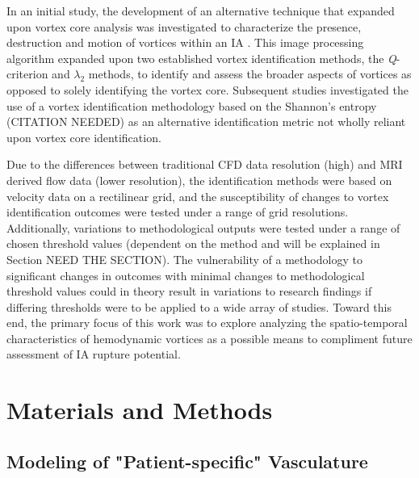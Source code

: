 In an initial study, the development of an alternative technique that expanded upon vortex core analysis was investigated to characterize the presence, destruction and motion of vortices within an IA \cite{sunderland2016vortex}. This image processing algorithm expanded upon two established vortex identification methods, the \textit{Q}-criterion \cite{hunt1988eddies} and $\lambda_2$ \cite{jeong1995identification} methods, to identify and assess the broader aspects of vortices as opposed to solely identifying the vortex core. Subsequent studies investigated the use of a vortex identification methodology based on the Shannon's entropy (CITATION NEEDED) as an alternative identification metric not wholly reliant upon vortex core identification. 

Due to the differences between traditional CFD data resolution (high) and MRI derived flow data (lower resolution), the identification methods were based on velocity data on a rectilinear grid, and the susceptibility of changes to vortex identification outcomes were tested under a range of grid resolutions. Additionally, variations to methodological outputs were tested under a range of chosen threshold values (dependent on the method and will be explained in Section NEED THE SECTION). The vulnerability of a methodology to significant changes in outcomes with minimal changes to methodological threshold values could in theory result in variations to research findings if differing thresholds were to be applied to a wide array of studies. Toward this end, the primary focus of this work was to explore analyzing the spatio-temporal characteristics of hemodynamic vortices as a possible means to compliment future assessment of IA rupture potential.  

\section{Materials and Methods}\label{CHAPTER2_SECTION1}
\subsection{Modeling of "Patient-specific" Vasculature}\label{CHAPTER2_SECTION1_SUBSECTION1}

